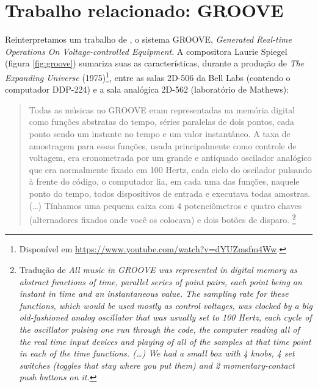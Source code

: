 \section{Trabalho relacionado: GROOVE}

Reinterpretamos um trabalho de \cite{mathews_groove_1970}, o sistema GROOVE, \emph{Generated Real-time Operations On Voltage-controlled Equipment}. A compositora Laurie Spiegel (figura \ref{fig:groove}) sumariza suas as características, durante a produção de \emph{The Expanding Universe} (1975)\footnote{Disponível em \url{https://www.youtube.com/watch?v=dYUZmsfm4Ww}.}, entre as salas 2D-506 da Bell Labs (contendo o computador DDP-224) e a sala analógica 2D-562 (laboratório de Mathews):

\begin{quote}
\small{Todas as músicas no GROOVE eram representadas na memória digital como funções abstratas do tempo, séries paralelas de dois pontos, cada ponto sendo um instante no tempo e um valor instantâneo. A taxa de amostragem para essas funções, usada principalmente como controle de voltagem, era cronometrada por um grande e antiquado oscilador analógico que era normalmente fixado em 100 Hertz, cada ciclo do oscilador pulsando à frente do código, o computador lia, em cada uma das funções, naquele ponto do tempo, todos dispositivos de entrada e executava todas amostras. (\ldots) Tínhamos uma pequena caixa com 4 potenciômetros e quatro chaves (alternadores fixados onde você os colocava) e dois botões de disparo.} \footnote{Tradução de \emph{All music in GROOVE was represented in digital memory as abstract functions of time, parallel series of point pairs, each point being an instant in time and an instantaneous value. The sampling rate for these functions, which would be used mostly as control voltages, was clocked by a big old-fashioned analog oscillator that was usually set to 100 Hertz, each cycle of the oscillator pulsing one run through the code, the computer reading all of the real time input devices and playing of all of the samples at that time point in each of the time functions. (\ldots)  We had a small box with 4 knobs, 4 set switches (toggles that stay where you put them) and 2 momentary-contact push buttons on it.}}
\end{quote}

